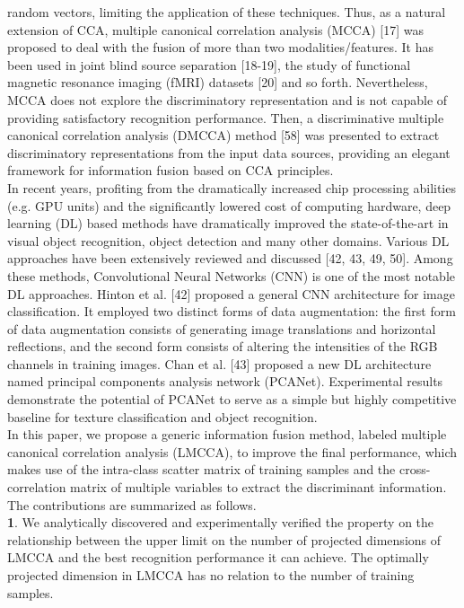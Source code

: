 \documentclass[journal]{IEEEtran}
\begin{document}
random vectors, limiting the application of these techniques. Thus, as a natural extension of CCA, multiple canonical correlation analysis (MCCA) [17] was proposed to deal with the fusion of more than two modalities/features. It has been used in joint blind source separation [18-19], the study of functional magnetic resonance imaging (fMRI) datasets [20] and so forth. Nevertheless, MCCA does not explore the discriminatory representation and is not capable of providing satisfactory recognition performance. Then, a discriminative multiple canonical correlation analysis (DMCCA) method [58] was presented to extract discriminatory representations from the input data sources, providing an elegant framework for information fusion based on CCA principles.\\\indent In recent years, profiting from the dramatically increased chip processing abilities (e.g. GPU units) and the significantly lowered cost of computing hardware, deep learning (DL) based methods have dramatically improved the state-of-the-art in visual object recognition, object detection and many other domains. Various DL approaches have been extensively reviewed and discussed [42, 43, 49, 50]. Among these methods, Convolutional Neural Networks (CNN) is one of the most notable DL approaches. Hinton et al. [42] proposed a general CNN architecture for image classification. It employed two distinct forms of data augmentation: the first form of data augmentation consists of generating image translations and horizontal reflections, and the second form consists of altering the intensities of the RGB channels in training images. Chan et al. [43] proposed a new DL architecture named principal components analysis network (PCANet). Experimental results demonstrate the potential of PCANet to serve as a simple but highly competitive baseline for texture classification and object recognition.\\\indent In this paper, we propose a generic information fusion method, labeled multiple canonical correlation analysis (LMCCA), to improve the final performance, which makes use of the intra-class scatter matrix of training samples and the cross-correlation matrix of multiple variables to extract the discriminant information. The contributions are summarized as follows.\\
\textbf{1}. We analytically discovered and experimentally verified the property on the relationship between the upper limit on the number of projected dimensions of LMCCA and the best recognition performance it can achieve. The optimally projected dimension in LMCCA has no relation to the number of training samples. \\
\end{document}
